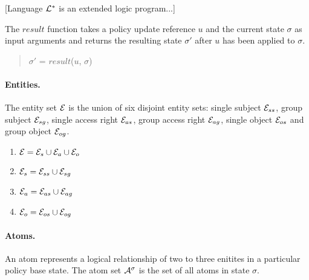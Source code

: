 \documentclass[10pt, twocolumn]{article}
\begin{document}
        [Language ${\cal L}^{*}$ is an extended logic program...]

        The $result$ function takes a policy update reference $u$ and the
        current state $\sigma$ as input arguments and returns the resulting
        state $\sigma'$ after $u$ has been applied to $\sigma$.

        \begin{quote}
          $\sigma'$ = $result$($u$, $\sigma$)
        \end{quote}

        \paragraph{Entities.}

          The entity set ${\cal E}$ is the union of six disjoint entity sets:
          single subject ${\cal E}_{ss}$, group subject ${\cal E}_{sg}$,
          single access right ${\cal E}_{as}$, group access right
          ${\cal E}_{ag}$, single object ${\cal E}_{os}$ and group object
          ${\cal E}_{og}$.

          \begin{enumerate}
            \item
              ${\cal E} = {\cal E}_{s} \cup {\cal E}_{a} \cup {\cal E}_{o}$
            \item
              ${\cal E}_{s} = {\cal E}_{ss} \cup {\cal E}_{sg}$
            \item
              ${\cal E}_{a} = {\cal E}_{as} \cup {\cal E}_{ag}$
            \item
              ${\cal E}_{o} = {\cal E}_{os} \cup {\cal E}_{og}$
          \end{enumerate}

        \paragraph{Atoms.}

          An atom represents a logical relationship of two to three enitites
          in a particular policy base state. The atom set ${\cal A}^{\sigma}$
          is the set of all atoms in state $\sigma$.
\end{document}
